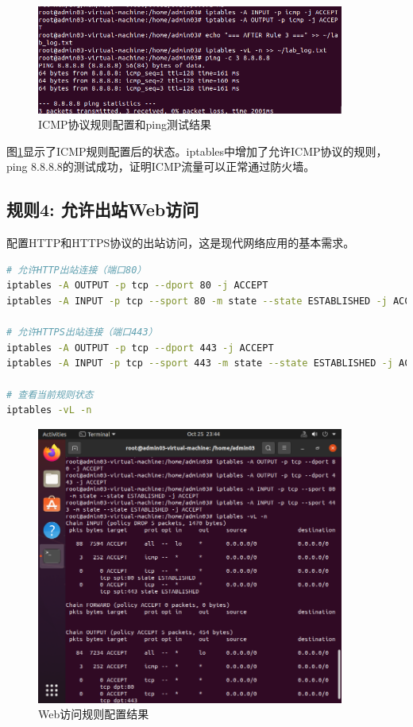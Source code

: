 \documentclass[12pt,a4paper]{article}
\begin{document}
\begin{figure}[H]
    \centering
    \includegraphics[width=0.9\textwidth]{05_icmp_rul.png}
    \caption{ICMP协议规则配置和ping测试结果}
    \label{fig:icmp_rule}
\end{figure}

图\ref{fig:icmp_rule}显示了ICMP规则配置后的状态。iptables中增加了允许ICMP协议的规则，ping 8.8.8.8的测试成功，证明ICMP流量可以正常通过防火墙。

\subsection{规则4: 允许出站Web访问}

配置HTTP和HTTPS协议的出站访问，这是现代网络应用的基本需求。

\begin{lstlisting}[language=bash, caption=配置Web访问规则]
# 允许HTTP出站连接（端口80）
iptables -A OUTPUT -p tcp --dport 80 -j ACCEPT
iptables -A INPUT -p tcp --sport 80 -m state --state ESTABLISHED -j ACCEPT

# 允许HTTPS出站连接（端口443）
iptables -A OUTPUT -p tcp --dport 443 -j ACCEPT
iptables -A INPUT -p tcp --sport 443 -m state --state ESTABLISHED -j ACCEPT

# 查看当前规则状态
iptables -vL -n
\end{lstlisting}

\begin{figure}[H]
    \centering
    \includegraphics[width=0.9\textwidth]{06_web_access_rule.png}
    \caption{Web访问规则配置结果}
    \label{fig:web_access_rule}
\end{figure}
\end{document}
